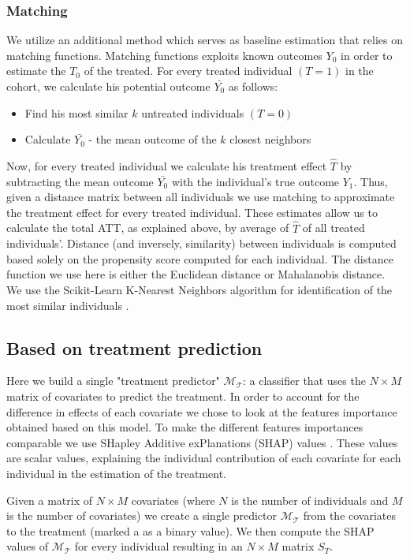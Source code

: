 \documentclass{article}
\begin{document}
\subsubsection{Matching}
We utilize an additional method which serves as baseline estimation that relies on matching functions. Matching functions exploits known outcomes $Y_0$ in order to estimate the $T_0$ of the treated.
For every treated individual $(T=1)$ in the cohort, we calculate his potential outcome $\bar{Y_0}$  as follows: 
\begin{itemize}
    \item Find his most similar $k$ untreated individuals $(T=0)$ 
    \item Calculate $\bar{Y_0}$ - the mean outcome of the $k$ closest neighbors 
\end{itemize}
Now, for every treated individual we calculate his treatment effect $\widehat{T}$ by subtracting the mean outcome $\bar{Y_0}$ with the individual's true outcome $Y_1$. 
Thus, given a distance matrix between all individuals we use matching to approximate the treatment effect for every treated individual. 
These estimates allow us to calculate the total ATT, as explained above, by average of $\widehat{T}$ of all treated individuals'. 
Distance (and inversely, similarity) between individuals is computed based solely on the propensity score computed for each individual. 
The distance function we use here is either the Euclidean distance or Mahalanobis distance.
We use the Scikit-Learn K-Nearest Neighbors algorithm for identification of the most similar individuals \cite{scikit-learn}. 

\subsection{Based on treatment prediction}
Here we build a single "treatment predictor" $\mathcal{M_T}$: a classifier that uses the $N\times{}M$ matrix of covariates to predict the treatment. 
In order to account for the difference in effects of each covariate we chose to look at the features importance obtained based on this model. 
To make the different features importances comparable we use SHapley Additive exPlanations (SHAP) values \cite{lundberg2017unified}. 
These values are scalar values, explaining the individual contribution of each covariate for each individual in the estimation of the treatment. 

Given a matrix of $N\times{}M$ covariates (where $N$ is the number of individuals and $M$ is the number of covariates) we create a single predictor $\mathcal{M_T}$ from the covariates to the treatment (marked a as a binary value). We then compute the SHAP values of $\mathcal{M_T}$ for every individual resulting in an $N\times{}M$ matrix $S_T$. 
\end{document}
